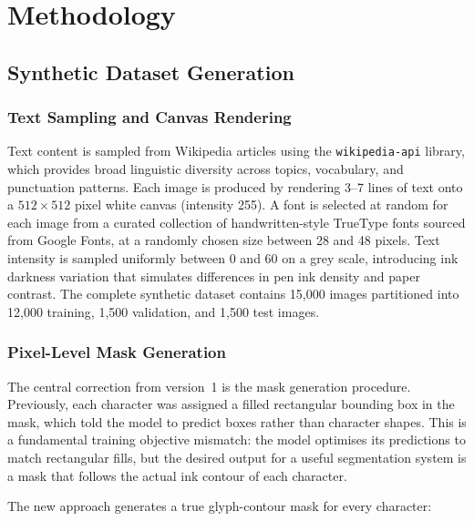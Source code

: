 \documentclass[a4paper,11pt]{article}
\begin{document}
\section{Methodology}
\label{sec:methodology}

\subsection{Synthetic Dataset Generation}

\subsubsection{Text Sampling and Canvas Rendering}

Text content is sampled from Wikipedia articles using the \texttt{wikipedia-api} library,
which provides broad linguistic diversity across topics, vocabulary, and punctuation
patterns. Each image is produced by rendering 3--7 lines of text onto a $512 \times 512$
pixel white canvas (intensity 255). A font is selected at random for each image from a
curated collection of handwritten-style TrueType fonts sourced from Google Fonts, at a
randomly chosen size between 28 and 48 pixels. Text intensity is sampled uniformly
between 0 and 60 on a grey scale, introducing ink darkness variation that simulates
differences in pen ink density and paper contrast. The complete synthetic dataset contains
15,000 images partitioned into 12,000 training, 1,500 validation, and 1,500 test images.

\subsubsection{Pixel-Level Mask Generation}
\label{sec:pixel_masks}

The central correction from version~1 is the mask generation procedure. Previously, each
character was assigned a filled rectangular bounding box in the mask, which told the
model to predict boxes rather than character shapes. This is a fundamental training
objective mismatch: the model optimises its predictions to match rectangular fills, but
the desired output for a useful segmentation system is a mask that follows the actual ink
contour of each character.

The new approach generates a true glyph-contour mask for every character:
\end{document}
